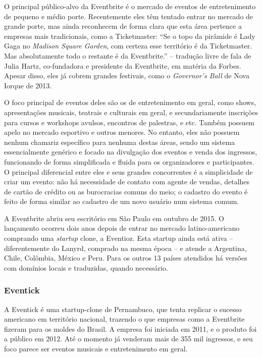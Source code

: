 \documentclass[12pt,a4paper,twoside,hyphens,english,brazil]{abntex2}
\begin{document}
O principal público-alvo da Eventbrite é o mercado de eventos de entretenimento de pequeno e médio porte. Recentemente eles têm tentado entrar no mercado de grande porte, mas ainda reconhecem de forma clara que esta área pertence a empresas mais tradicionais, como a Ticketmaster: ``Se o topo da pirâmide é Lady Gaga no \emph{Madison Square Garden}, com certeza esse território é da Ticketmaster. Mas absolutamente todo o restante é da Eventbrite.'' -- tradução livre de fala de Julia Hartz, co-fundadora e presidente da Eventbrite, em matéria da Forbes\cite{eventbrite-lucro-forbes}. Apesar disso, eles já cobrem grandes festivais, como o \emph{Governor's Ball} de Nova Iorque de 2013.\cite{eventbrite-lucro-forbes}

O foco principal de eventos deles são os de entretenimento em geral, como shows, apresentações musicais, teatrais e culturais em geral, e secundariamente inscrições para cursos e workshops avulsos, encontros de palestras, e etc. Também possuem apelo no mercado esportivo e outros menores. No entanto, eles não possuem nenhum chamariz específico para nenhuma destas áreas, sendo um sistema essencialmente genérico e focado na divulgação dos eventos e venda dos ingressos, funcionando de forma simplificada e fluida para os organizadores e participantes. O principal diferencial entre eles e seus grandes concorrentes é a simplicidade de criar um evento: não há necessidade de contato com agente de vendas, detalhes de cartão de crédito ou as burocracias comuns do meio; o cadastro do evento é feito de forma similar ao cadastro de um novo usuário num sistema comum.

A Eventbrite abriu seu escritório em São Paulo em outubro de 2015\cite{eventbrite-sp}. O lançamento ocorreu dois anos depois de entrar no mercado latino-americano comprando uma \emph{startup} clone, a Eventioz\cite{eventbrite-eventioz}. Esta startup ainda está ativa -- diferentemente do Lanyrd, comprado na mesma época -- e atende a Argentina, Chile, Colômbia, México e Peru. Para os outros 13 países atendidos há versões com domínios locais e traduzidas, quando necessário.

\subsubsection*{Eventick}
A Eventick é uma startup-clone de Pernambuco, que tenta replicar o sucesso americano em território nacional, trazendo o que empresas como a Eventbrite fizeram para os moldes do Brasil. A empresa foi iniciada em 2011, e o produto foi a público em 2012.\cite{eventick-startupi} Até o momento já venderam mais de 355 mil ingressos\cite{eventick-home}, e seu foco parece ser eventos musicais e entretenimento em geral.
\end{document}
